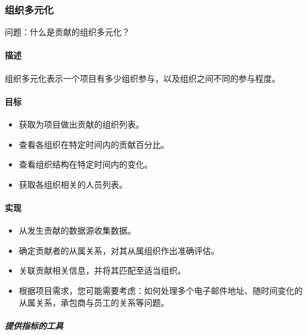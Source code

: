 \hypertarget{ux7ec4ux7ec7ux591aux5143ux5316}{%
\subsubsection{组织多元化}\label{ux7ec4ux7ec7ux591aux5143ux5316}}

问题：什么是贡献的组织多元化？

\hypertarget{ux63cfux8ff0}{%
\paragraph{描述}\label{ux63cfux8ff0}}

组织多元化表示一个项目有多少组织参与，以及组织之间不同的参与程度。

\hypertarget{ux76eeux6807}{%
\paragraph{目标}\label{ux76eeux6807}}

\begin{itemize}
\tightlist
\item
  获取为项目做出贡献的组织列表。
\item
  查看各组织在特定时间内的贡献百分比。
\item
  查看组织结构在特定时间内的变化。
\item
  获取各组织相关的人员列表。
\end{itemize}

\hypertarget{ux5b9eux73b0}{%
\paragraph{实现}\label{ux5b9eux73b0}}

\begin{itemize}
\tightlist
\item
  从发生贡献的数据源收集数据。
\item
  确定贡献者的从属关系，对其从属组织作出准确评估。
\item
  关联贡献相关信息，并将其匹配至适当组织。
\item
  根据项目需求，您可能需要考虑：如何处理多个电子邮件地址、随时间变化的从属关系，承包商与员工的关系等问题。
\end{itemize}

\hypertarget{ux63d0ux4f9bux6307ux6807ux7684ux5de5ux5177}{%
\subparagraph{提供指标的工具}\label{ux63d0ux4f9bux6307ux6807ux7684ux5de5ux5177}}

